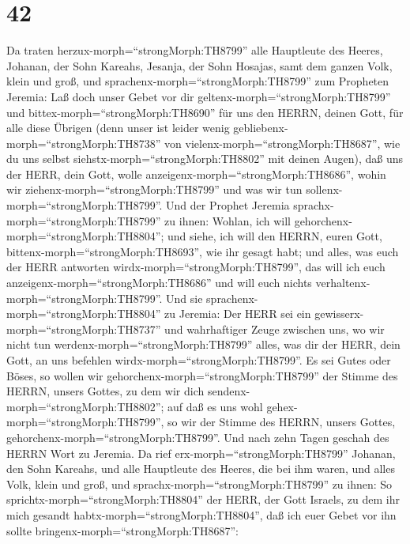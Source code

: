 \hypertarget{section-41}{%
\section{42}\label{section-41}}

 Da traten herzux-morph=``strongMorph:TH8799'' alle
Hauptleute des Heeres, Johanan, der Sohn Kareahs, Jesanja, der Sohn
Hosajas, samt dem ganzen Volk, klein und groß,  und
sprachenx-morph=``strongMorph:TH8799'' zum Propheten Jeremia: Laß doch
unser Gebet vor dir geltenx-morph=``strongMorph:TH8799'' und
bittex-morph=``strongMorph:TH8690'' für uns den HERRN, deinen Gott, für
alle diese Übrigen (denn unser ist leider wenig
gebliebenx-morph=``strongMorph:TH8738'' von
vielenx-morph=``strongMorph:TH8687'', wie du uns selbst
siehstx-morph=``strongMorph:TH8802'' mit deinen Augen),  daß
uns der HERR, dein Gott, wolle anzeigenx-morph=``strongMorph:TH8686'',
wohin wir ziehenx-morph=``strongMorph:TH8799'' und was wir tun
sollenx-morph=``strongMorph:TH8799''.  Und der Prophet
Jeremia sprachx-morph=``strongMorph:TH8799'' zu ihnen: Wohlan, ich will
gehorchenx-morph=``strongMorph:TH8804''; und siehe, ich will den HERRN,
euren Gott, bittenx-morph=``strongMorph:TH8693'', wie ihr gesagt habt;
und alles, was euch der HERR antworten
wirdx-morph=``strongMorph:TH8799'', das will ich euch
anzeigenx-morph=``strongMorph:TH8686'' und will euch nichts
verhaltenx-morph=``strongMorph:TH8799''.  Und sie
sprachenx-morph=``strongMorph:TH8804'' zu Jeremia: Der HERR sei ein
gewisserx-morph=``strongMorph:TH8737'' und wahrhaftiger Zeuge zwischen
uns, wo wir nicht tun werdenx-morph=``strongMorph:TH8799'' alles, was
dir der HERR, dein Gott, an uns befehlen
wirdx-morph=``strongMorph:TH8799''.  Es sei Gutes oder
Böses, so wollen wir gehorchenx-morph=``strongMorph:TH8799'' der Stimme
des HERRN, unsers Gottes, zu dem wir dich
sendenx-morph=``strongMorph:TH8802''; auf daß es uns wohl
gehex-morph=``strongMorph:TH8799'', so wir der Stimme des HERRN, unsers
Gottes, gehorchenx-morph=``strongMorph:TH8799''.  Und nach
zehn Tagen geschah des HERRN Wort zu Jeremia.  Da rief
erx-morph=``strongMorph:TH8799'' Johanan, den Sohn Kareahs, und alle
Hauptleute des Heeres, die bei ihm waren, und alles Volk, klein und
groß,  und sprachx-morph=``strongMorph:TH8799'' zu ihnen: So
sprichtx-morph=``strongMorph:TH8804'' der HERR, der Gott Israels, zu dem
ihr mich gesandt habtx-morph=``strongMorph:TH8804'', daß ich euer Gebet
vor ihn sollte bringenx-morph=``strongMorph:TH8687'': 
